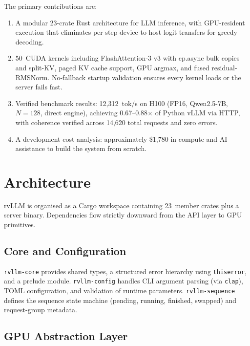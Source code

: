 The primary contributions are:
\begin{enumerate}
  \item A modular 23-crate Rust architecture for LLM inference, with GPU-resident
        execution that eliminates per-step device-to-host logit transfers for greedy
        decoding.
  \item 50~CUDA kernels including FlashAttention-3 v3 with cp.async bulk copies and split-KV,
        paged KV cache support, GPU argmax, and fused residual-RMSNorm. No-fallback
        startup validation ensures every kernel loads or the server fails fast.
  \item Verified benchmark results: 12{,}312~tok/s on H100 (FP16, Qwen2.5-7B, $N\!=\!128$, direct engine),
        achieving 0.67--0.88$\times$ of Python vLLM via HTTP, with coherence verified across 14{,}620 total
        requests and zero errors.
  \item A development cost analysis: approximately \$1{,}780 in compute and AI
        assistance to build the system from scratch.
\end{enumerate}

\section{Architecture}
\label{sec:architecture}

rvLLM is organised as a Cargo workspace containing 23~member crates plus a server
binary. Dependencies flow strictly downward from the API layer to GPU primitives.

\subsection{Core and Configuration}

\texttt{rvllm-core} provides shared types, a structured error hierarchy using
\texttt{thiserror}, and a prelude module. \texttt{rvllm-config} handles CLI argument
parsing (via \texttt{clap}), TOML configuration, and validation of runtime
parameters. \texttt{rvllm-sequence} defines the sequence state machine
(pending, running, finished, swapped) and request-group metadata.

\subsection{GPU Abstraction Layer}

